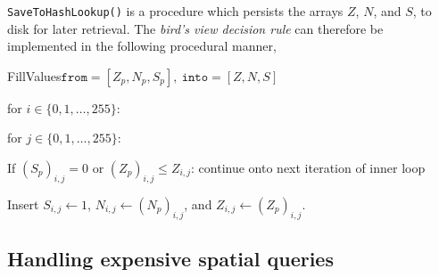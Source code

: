 \texttt{SaveToHashLookup()} is a procedure which persists the arrays $Z$, $N$, and $S$, to disk for later retrieval.
The \textit{bird's view decision rule} can therefore be implemented in the following procedural manner,
\begin{pseudofunc}{FillValues}{$\texttt{from}=[Z_p, N_p, S_p],~\texttt{into}=[Z, N, S]$}
  \item for $i \in \{0, 1, \ldots, 255\}$:
  \begin{pseudoloop}
    \item for $j \in \{0, 1, \ldots, 255\}$:
    \begin{pseudoloop}
      \item If $(S_p)_{i,j} = 0$ or $(Z_p)_{i,j} \leq Z_{i,j}$: continue onto next iteration of inner loop
      \item Insert $S_{i,j} \leftarrow 1$, $N_{i,j} \leftarrow (N_p)_{i,j}$, and $Z_{i,j} \leftarrow (Z_p)_{i,j}$.
    \end{pseudoloop}
  \end{pseudoloop}
\end{pseudofunc}

\subsection{Handling expensive spatial queries}

